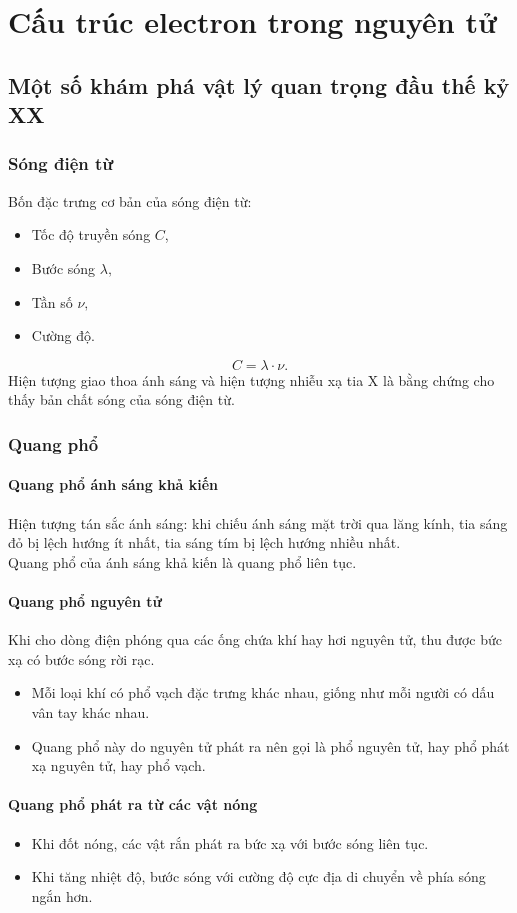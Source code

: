 \chapter{Cấu trúc electron trong nguyên tử}
\section{Một số khám phá vật lý quan trọng đầu thế kỷ XX}
\subsection{Sóng điện từ}
Bốn đặc trưng cơ bản của sóng điện từ:
\begin{itemize}
\item Tốc độ truyền sóng $C$,
\item Bước sóng $\lambda,$
\item Tần số $\nu,$
\item Cường độ.
\end{itemize}
$$C = \lambda \cdot \nu.$$
Hiện tượng giao thoa ánh sáng và hiện tượng nhiễu xạ tia X là bằng chứng cho thấy bản chất sóng của sóng điện từ.
\subsection{Quang phổ}
\subsubsection{Quang phổ ánh sáng khả kiến}
Hiện tượng tán sắc ánh sáng: khi chiếu ánh sáng mặt trời qua lăng kính, tia sáng đỏ bị lệch hướng ít nhất, tia sáng tím bị lệch hướng nhiều nhất.\\
Quang phổ của ánh sáng khả kiến là quang phổ liên tục.
\subsubsection{Quang phổ nguyên tử}
Khi cho dòng điện phóng qua các ống chứa khí hay hơi nguyên tử, thu được bức xạ có bước sóng rời rạc.
\begin{itemize}
\item Mỗi loại khí có phổ vạch đặc trưng khác nhau, giống như mỗi người có dấu vân tay khác nhau.
\item Quang phổ này do nguyên tử phát ra nên gọi là phổ nguyên tử, hay phổ phát xạ nguyên tử, hay phổ vạch.
\end{itemize}
\subsubsection{Quang phổ phát ra từ các vật nóng}
\begin{itemize}
\item Khi đốt nóng, các vật rắn phát ra bức xạ với bước sóng liên tục.
\item Khi tăng nhiệt độ, bước sóng với cường độ cực địa di chuyển về phía sóng ngắn hơn.
\end{itemize}
